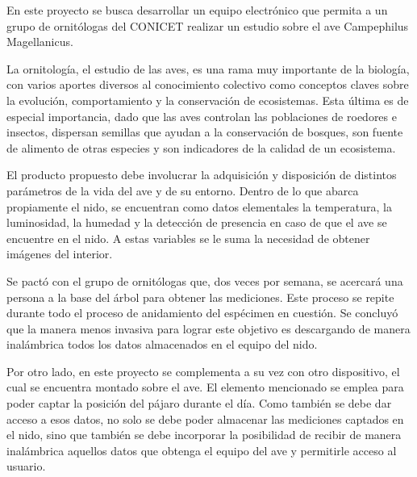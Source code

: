 En este proyecto se busca desarrollar un equipo electrónico que permita a un grupo de ornitólogas del CONICET realizar un estudio sobre el ave Campephilus Magellanicus.

La ornitología, el estudio de las aves, es una rama muy importante de la biología, con varios aportes diversos al conocimiento colectivo como conceptos claves sobre la evolución, comportamiento y la conservación de ecosistemas. Esta última es de especial importancia, dado que las aves controlan las poblaciones de roedores e insectos, dispersan semillas que ayudan a la conservación de bosques, son fuente de alimento de otras especies y son indicadores de la calidad de un ecosistema.

El producto propuesto debe involucrar la adquisición y disposición de distintos parámetros de la vida del ave y de su entorno. Dentro de lo que abarca propiamente el nido, se encuentran como datos elementales la temperatura, la luminosidad, la humedad y la detección de presencia en caso de que el ave se encuentre en el nido. A estas variables se le suma la necesidad de obtener imágenes del interior.

Se pactó con el grupo de ornitólogas que, dos veces por semana, se acercará una persona a la base del árbol para obtener las mediciones. Este proceso se repite durante todo el proceso de anidamiento del espécimen en cuestión. Se concluyó que la manera menos invasiva para lograr este objetivo es descargando de manera inalámbrica todos los datos almacenados en el equipo del nido. 

Por otro lado, en este proyecto se complementa a su vez con otro dispositivo, el cual se encuentra montado sobre el ave. El elemento mencionado se emplea para poder captar la posición del pájaro durante el día. Como también se debe dar acceso a esos datos, no solo se debe poder almacenar las mediciones captados en el nido, sino que también se debe incorporar la posibilidad de recibir de manera inalámbrica aquellos datos que obtenga el equipo del ave y permitirle acceso al usuario. 